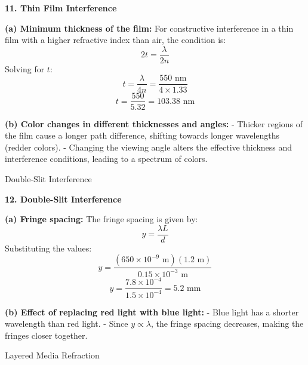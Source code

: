 \documentclass[addpoints]{exam}
\begin{document}
\begin{questions}
\begin{solution} [8cm]
\textbf{11. Thin Film Interference}  

\textbf{(a) Minimum thickness of the film:}  
For constructive interference in a thin film with a higher refractive index than air, the condition is:  
\[
2 t = \frac{\lambda}{2n}
\]
Solving for \( t \):  
\[
 t = \frac{\lambda}{4n} = \frac{550 \text{ nm}}{4 \times 1.33}
\]
\[
 t = \frac{550}{5.32} = 103.38 \text{ nm}
\]

\textbf{(b) Color changes in different thicknesses and angles:}  
- Thicker regions of the film cause a longer path difference, shifting towards longer wavelengths (redder colors).
- Changing the viewing angle alters the effective thickness and interference conditions, leading to a spectrum of colors.

\end{solution}


\question Double-Slit Interference
\begin{solution} [8cm]

\textbf{12. Double-Slit Interference}  

\textbf{(a) Fringe spacing:}  
The fringe spacing is given by:  
\[
 y = \frac{\lambda L}{d}
\]
Substituting the values:  
\[
 y = \frac{(650 \times 10^{-9} \text{ m}) (1.2 \text{ m})}{0.15 \times 10^{-3} \text{ m}}
\]
\[
 y = \frac{7.8 \times 10^{-4}}{1.5 \times 10^{-4}} = 5.2 \text{ mm}
\]

\textbf{(b) Effect of replacing red light with blue light:}  
- Blue light has a shorter wavelength than red light.
- Since \( y \propto \lambda \), the fringe spacing decreases, making the fringes closer together.


\end{solution}




\question Layered Media Refraction
\end{questions}
\end{document}
